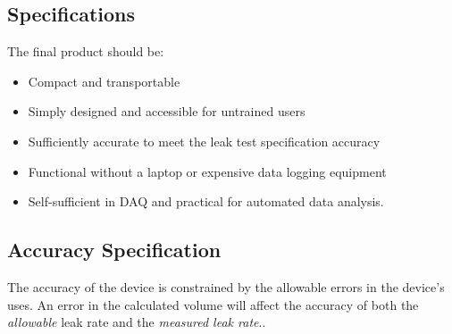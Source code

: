 \documentclass{report}
\begin{document}
\subsection{Specifications}
The final product should be:

\begin{itemize}
	\item{Compact and transportable}
	\item{Simply designed and accessible for untrained users}
	\item{Sufficiently accurate to meet the leak test specification accuracy}
	\item{Functional without a laptop or expensive data logging equipment}
	\item{Self-sufficient in DAQ and practical for automated data analysis.}
\end{itemize}

\subsection{Accuracy Specification}
The accuracy of the device is constrained by the allowable errors in the device's uses. An error in the calculated volume will affect the accuracy of both the \textit{allowable} leak rate and the \textit{measured leak rate}.\cite{leakPaola}.
\end{document}
